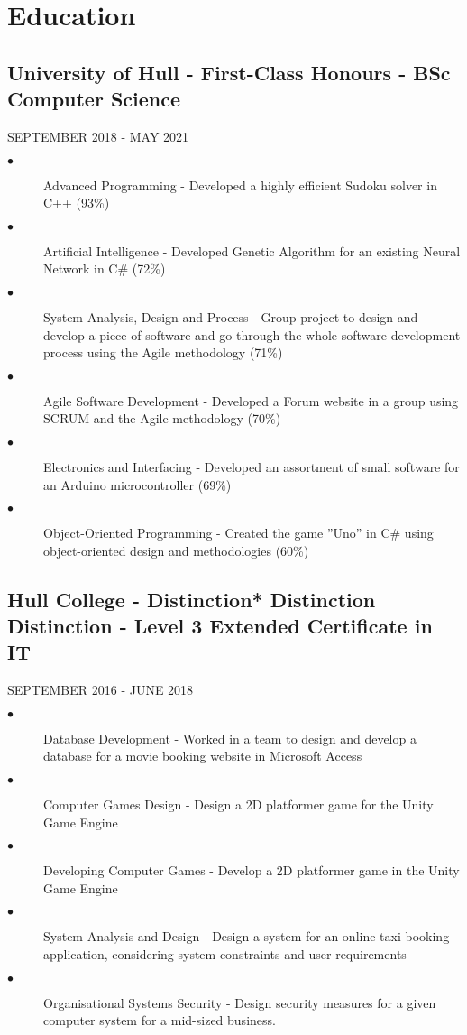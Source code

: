 \documentclass{article}
\begin{document}
\section{Education}
\noindent
\hfill
\begin{minipage}[t]{1\textwidth}
    \subsection{University of Hull - First-Class Honours \textnormal{- BSc Computer Science}}
    \footnotesize{SEPTEMBER 2018 - MAY 2021}
    \normalsize{}
    \begin{description}
        \item[$\bullet$]Advanced Programming - Developed a highly efficient Sudoku solver in C++ (93\%)
        \item[$\bullet$]Artificial Intelligence - Developed Genetic Algorithm for an existing Neural Network in C\# (72\%)
        \item[$\bullet$]System Analysis, Design and Process - Group project to design and develop a piece of software and go through the whole software development process using the Agile methodology (71\%)
        \item[$\bullet$]Agile Software Development - Developed a Forum website in a group using SCRUM and the Agile methodology (70\%)
        \item[$\bullet$]Electronics and Interfacing - Developed an assortment of small software for an Arduino microcontroller (69\%)
        \item[$\bullet$]Object-Oriented Programming - Created the game ”Uno” in C\# using object-oriented design and methodologies (60\%)
    \end{description}
    \subsection{Hull College - Distinction* Distinction Distinction \textnormal{- Level 3 Extended Certificate in IT}}

    \footnotesize{SEPTEMBER 2016 - JUNE 2018}
    \normalsize{}
    \begin{description}
        \item[$\bullet$]Database Development - Worked in a team to design and develop a database for a movie booking website in Microsoft Access
        \item[$\bullet$]Computer Games Design - Design a 2D platformer game for the Unity Game Engine
        \item[$\bullet$]Developing Computer Games - Develop a 2D platformer game in the Unity Game Engine
        \item[$\bullet$]System Analysis and Design - Design a system for an online taxi booking application, considering system constraints and user requirements
        \item[$\bullet$]Organisational Systems Security - Design security measures for a given computer system for a mid-sized business. 
    \end{description}

\end{minipage}
\end{document}
